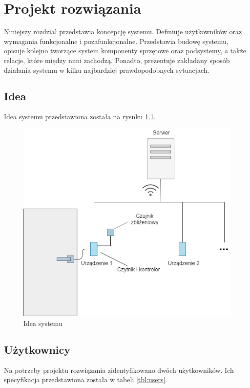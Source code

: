 \chapter{Projekt rozwiązania}
\label{chap:hl-arch}

    Niniejszy rozdział przedstawia koncepcję systemu. Definiuje użytkowników oraz wymagania funkcjonalne i pozafunkcjonalne. Przedstawia budowę systemu, opisuje kolejno tworzące system komponenty sprzętowe oraz podsystemy, a także relacje, które między nimi zachodzą. Ponadto, prezentuje zakładany sposób działania systemu w kilku najbardziej prawdopodobnych sytuacjach.

    \section{Idea}
        Idea systemu przedstawiona została na rysnku \ref{fig:door}.

        \begin{figure}[h!]
            \begin{center}
                \includegraphics[width=.7\linewidth]{chapters/images/door2.png}
                \caption{Idea systemu}
                \label{fig:door}
            \end{center}
        \end{figure}

    \section{Użytkownicy}
        Na potrzeby projektu rozwiązania zidentyfikowano dwóch użytkowników. Ich specyfikacja przedstawiona została w tabeli \ref{tbl:users}.


